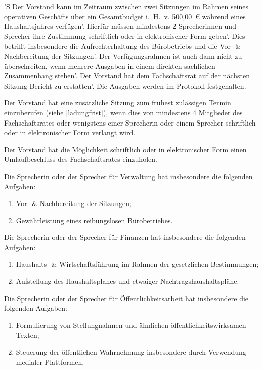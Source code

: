 \documentclass[%
	parskip=half,
]{scrartcl}
\newcommand{\edit}[1]{{\color{red} #1}}
\newcommand{\add}[1]{{\color{blue} #1}}
\begin{document}
\begin{contract}
'S \edit{Der Vorstand kann} im Zeitraum zwischen zwei Sitzungen im Rahmen \edit{seines} operativen Geschäfts
über ein Gesamtbudget i.~H.~v. \edit{500,00}~€ \add{während eines Haushaltsjahres} verfügen'. Hierfür müssen mindestens
2 \edit{Sprecherinnen und Sprecher} ihre Zustimmung schriftlich oder in elektronischer Form geben'. Dies betrifft
insbesondere die Aufrechterhaltung des Bürobetriebs und die Vor- \& Nachbereitung der Sitzungen'. Der Verfügungsrahmen
ist auch dann nicht zu überschreiten, wenn mehrere Ausgaben in einem direkten sachlichen Zusammenhang stehen'. 
\edit{Der Vorstand hat} dem Fachschaftsrat auf der nächsten Sitzung Bericht zu erstatten'. Die Ausgaben
werden im Protokoll festgehalten.

\edit{Der Vorstand hat} eine zusätzliche Sitzung zum frühest zulässigen Termin einzuberufen \add{(siehe 
\ref{ladungfrist})}, wenn dies von mindestens 4 Mitglieder des Fachschaftsrates oder \edit{wenigstens einer Sprecherin 
oder einem Sprecher} schriftlich oder in elektronischer Form verlangt wird.

\edit{Der Vorstand hat} die Möglichkeit schriftlich oder in elektronischer Form einen Umlaufbeschluss des 
Fachschaftsrates einzuholen.

\edit{Die Sprecherin oder der Sprecher} für Verwaltung hat insbesondere die folgenden Aufgaben:
\begin{enumerate}[\qquad a)]
	\item Vor- \& Nachbereitung der Sitzungen;
	\item Gewährleistung eines reibungslosen Bürobetriebes.
\end{enumerate}

\edit{Die Sprecherin oder der Sprecher} für Finanzen hat insbesondere die folgenden Aufgaben:
\begin{enumerate}[\qquad a)]
	\item Haushalts- \& Wirtschaftsführung im Rahmen der gesetzlichen Bestimmungen;
	\item Aufstellung des Haushaltsplanes und etwaiger Nachtragshaushaltspläne.
\end{enumerate}

\add{Die Sprecherin oder der Sprecher für Öffentlichkeitsarbeit hat insbesondere die folgenden Aufgaben:
\begin{enumerate}[\qquad a)]
	\item Formulierung von Stellungnahmen und ähnlichen öffentlichkeitswirksamen Texten;
	\item Steuerung der öffentlichen Wahrnehmung insbesondere durch Verwendung medialer Plattformen.
\end{enumerate}}


\end{contract}
\end{document}
